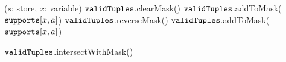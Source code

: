 \PROCEDURE \UpdateTable($s$: store, $x$: variable) \label{line:updateTableDelta:1} 
        \STATE $\texttt{validTuples}$.clearMask() \label{line:updateTableDelta:4} 
           \label{line:updateTableDelta:5} 
            \STATE $\texttt{validTuples}$.addToMask($\texttt{supports}[x,a]$) \label{line:updateTableDelta:6} 
          \ENDFOREACH      
          \STATE $\texttt{validTuples}$.reverseMask() \label{line:updateTableDelta:7} 
        \ELSE
           \label{line:updateTableDelta:8} 
            \STATE $\texttt{validTuples}$.addToMask($\texttt{supports}[x,a]$) \label{line:updateTableDelta:9} 
          \ENDFOREACH      

        \ENDIF
        \STATE $\texttt{validTuples}$.intersectWithMask() \label{line:updateTable:10} 
